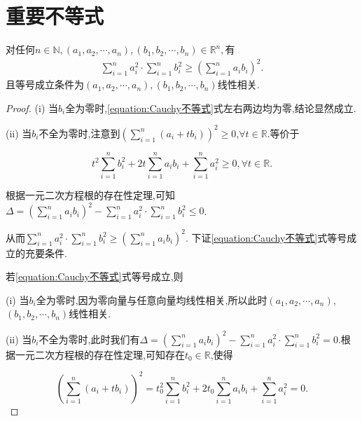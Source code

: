 \documentclass[../../main.tex]{subfiles}%
\begin{document}
\section{重要不等式}

\begin{theorem}\label{theorem:Cauchy不等式(离散版)}
对任何$n\in \mathbb{N} ,\left( a_1,a_2,\cdots ,a_n \right) ,\left( b_1,b_2,\cdots ,b_n \right) \in \mathbb{R} ^n,$有
\begin{align}\label{equation:Cauchy不等式}
\sum\limits_{i=1}^n{a_{i}^{2}\cdot}\sum\limits_{i=1}^n{b_{i}^{2}}\geqslant \left( \sum\limits_{i=1}^n{a_ib_i} \right) ^2.
\end{align}
且等号成立条件为$\left( a_1,a_2,\cdots ,a_n \right) ,\left( b_1,b_2,\cdots ,b_n \right)$线性相关.
\end{theorem}
\begin{proof}

(i) 当\(b_i\)全为零时,\eqref{equation:Cauchy不等式}式左右两边均为零,结论显然成立.

(ii) 当\(b_i\)不全为零时,注意到\(\left(\sum\limits_{i = 1}^{n}(a_i + tb_i)\right)^2 \geqslant 0\),\(\forall t \in \mathbb{R}\).等价于

\[
t^2\sum\limits_{i = 1}^{n}b_{i}^{2} + 2t\sum\limits_{i = 1}^{n}a_ib_i + \sum\limits_{i = 1}^{n}a_{i}^{2} \geqslant 0,  \forall t \in \mathbb{R}.
\]

根据一元二次方程根的存在性定理,可知\(\Delta = \left(\sum\limits_{i = 1}^{n}a_ib_i\right)^2 - \sum\limits_{i = 1}^{n}a_{i}^{2} \cdot \sum\limits_{i = 1}^{n}b_{i}^{2} \leqslant 0\).

从而\(\sum\limits_{i = 1}^{n}a_{i}^{2} \cdot \sum\limits_{i = 1}^{n}b_{i}^{2} \geqslant \left(\sum\limits_{i = 1}^{n}a_ib_i\right)^2\).
下证\eqref{equation:Cauchy不等式}式等号成立的充要条件.

若\eqref{equation:Cauchy不等式}式等号成立,则

(i) 当\(b_i\)全为零时,因为零向量与任意向量均线性相关,所以此时\((a_1,a_2,\cdots,a_n)\),\((b_1,b_2,\cdots,b_n)\)线性相关.

(ii) 当\(b_i\)不全为零时,此时我们有\(\Delta = \left(\sum\limits_{i = 1}^{n}a_ib_i\right)^2 - \sum\limits_{i = 1}^{n}a_{i}^{2} \cdot \sum\limits_{i = 1}^{n}b_{i}^{2} = 0\).根据一元二次方程根的存在性定理,可知存在\(t_0 \in \mathbb{R}\),使得

\[
\left(\sum\limits_{i = 1}^{n}(a_i + tb_i)\right)^2 = t_{0}^{2}\sum\limits_{i = 1}^{n}b_{i}^{2} + 2t_0\sum\limits_{i = 1}^{n}a_ib_i + \sum\limits_{i = 1}^{n}a_{i}^{2} = 0.
\]


\end{proof}
\end{document}
